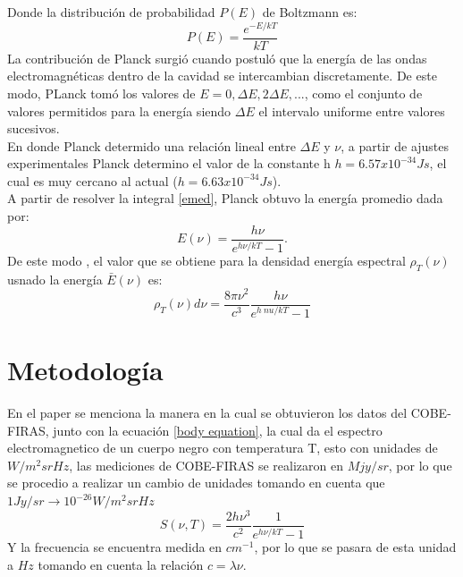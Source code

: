 \documentclass[12pt,letterpaper]{article}
\begin{document}
\begin{multicols}{2}
Donde la distribución de probabilidad $P(E)$ de Boltzmann es:
\begin{equation}
P(E)=\frac{e^{-E/kT}}{kT}
\end{equation}
La contribución de Planck surgió cuando postuló que la energía de las ondas electromagnéticas dentro de la cavidad se intercambian discretamente. De este modo, PLanck tomó los valores de $E=0,\Delta E,2\Delta E,...$,
como el conjunto de valores permitidos para la energía siendo $\Delta E$ el intervalo uniforme entre valores sucesivos.\\
En donde Planck determido una relación lineal entre $\Delta E$ y $\nu$, a partir de ajustes experimentales Planck determino el valor de la constante h $h=6.57x10^{-34} Js$, el cual es muy cercano al actual ($h=6.63x10^{-34} Js$). \\
A partir de resolver la integral \ref{emed}, Planck obtuvo la energía promedio dada por:
\begin{equation}
E(\nu) = \frac{h\nu}{e^{h\nu/kT}-1}.
\end{equation}
De este modo , el valor que se obtiene para la densidad energía espectral $\rho_T(\nu)$ usnado la energía $\bar{E}(\nu)$ es:
\begin{equation}
\rho_T(\nu) d\nu = \frac{8\pi \nu^2}{c^3} \frac{h \nu }{e^{h\ nu /kT}-1}
\end{equation}
\section*{Metodología}
En el paper \cite{Eccarelli1996} se menciona la manera en la cual se obtuvieron los datos del COBE-FIRAS, junto con la ecuación \ref{body equation}, la cual da el espectro electromagnetico de un cuerpo negro con temperatura T, esto con unidades de  $W/m^2srHz$, las mediciones de COBE-FIRAS se realizaron en $Mjy/sr$, por lo que se procedio a realizar un cambio de unidades tomando en cuenta que $1 Jy /sr \rightarrow 10^{-26} W/m^2 srHz $
\begin{equation}
S(\nu,T)= \frac{2h\nu^3}{c^2} \frac{1}{e^{h\nu/kT}-1}
\label{body equation}
\end{equation}
Y la frecuencia se encuentra medida en $cm^{-1}$, por lo que se pasara de esta unidad a $Hz$ tomando en cuenta la relación $c=\lambda \nu $.

\end{multicols}
\end{document}
